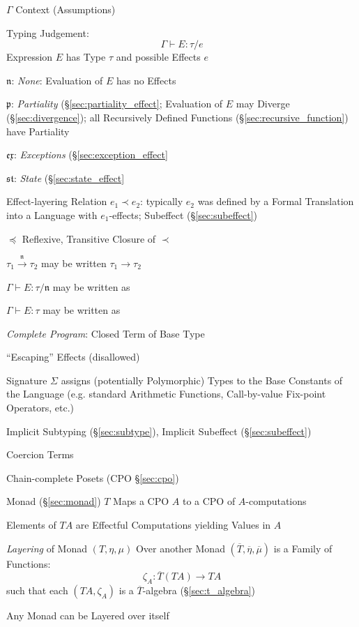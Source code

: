 $\Gamma$ Context (Assumptions)

Typing Judgement:
\[
  \Gamma \vdash E : \tau / e
\]
Expression $E$ has Type $\tau$ and possible Effects $e$

$\mathfrak{n}$: \emph{None}: Evaluation of $E$ has no Effects

$\mathfrak{p}$: \emph{Partiality} (\S\ref{sec:partiality_effect};
Evaluation of $E$ may Diverge (\S\ref{sec:divergence}); all
Recursively Defined Functions (\S\ref{sec:recursive_function}) have
Partiality

$\mathfrak{ex}$: \emph{Exceptions} (\S\ref{sec:exception_effect}

$\mathfrak{st}$: \emph{State} (\S\ref{sec:state_effect}

Effect-layering Relation $e_1 \prec e_2$: typically $e_2$ was defined
by a Formal Translation into a Language with $e_1$-effects; Subeffect
(\S\ref{sec:subeffect})

$\preceq$ Reflexive, Transitive Closure of $\prec$

$\tau_1 \xrightarrow{\mathfrak{n}} \tau_2$ may be written $\tau_1
\rightarrow \tau_2$

$\Gamma \vdash E : \tau / \mathfrak{n}$ may be written as

$\Gamma \vdash E : \tau$ may be written as

\emph{Complete Program}: Closed Term of Base Type

``Escaping'' Effects (disallowed)

Signature $\Sigma$ assigns (potentially Polymorphic) Types to the Base
Constants of the Language (e.g. standard Arithmetic Functions,
Call-by-value Fix-point Operators, etc.)

Implicit Subtyping (\S\ref{sec:subtype}), Implicit Subeffect
(\S\ref{sec:subeffect})

Coercion Terms

Chain-complete Posets (CPO \S\ref{sec:cpo})

Monad (\S\ref{sec:monad}) $T$ Maps a CPO $A$ to a CPO of
$A$-computations

Elements of $T A$ are Effectful Computations yielding Values in $A$

\emph{Layering} of Monad $(T,\eta,\mu)$ Over another Monad
$(\overline{T}, \overline{\eta}, \overline{\mu})$ is a Family of
Functions:
\[
  \zeta_A : \overline{T}(T A) \rightarrow T A
\]
such that each $(T A, \zeta_A)$ is a $\overline{T}$-algebra
(\S\ref{sec:t_algebra}) %

Any Monad can be Layered over itself %

